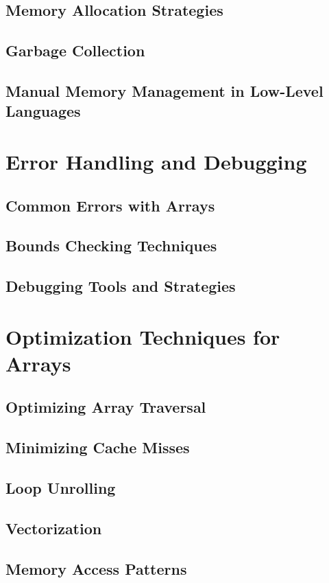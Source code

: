 \documentclass[12pt, oneside]{book}
\begin{document}
\section{Memory Allocation Strategies}
\section{Garbage Collection}
\section{Manual Memory Management in Low-Level Languages}

\chapter{Error Handling and Debugging}
\section{Common Errors with Arrays}
\section{Bounds Checking Techniques}
\section{Debugging Tools and Strategies}

\chapter{Optimization Techniques for Arrays}
\section{Optimizing Array Traversal}
\section{Minimizing Cache Misses}
\section{Loop Unrolling}
\section{Vectorization}
\section{Memory Access Patterns}
\end{document}
